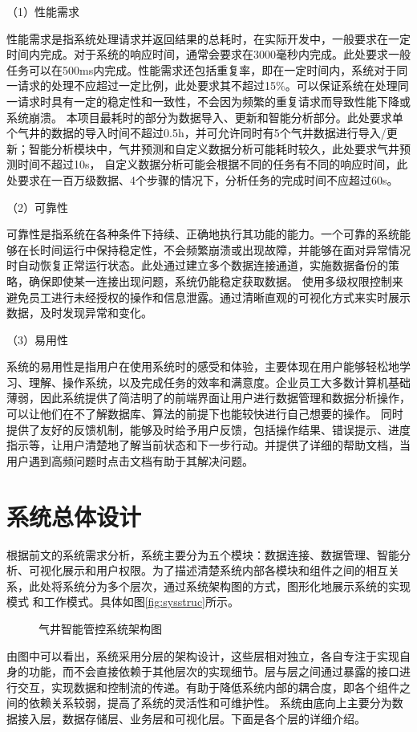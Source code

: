 （1）性能需求

性能需求是指系统处理请求并返回结果的总耗时，在实际开发中，一般要求在一定时间内完成。对于系统的响应时间，通常会要求在3000毫秒内完成。此处要求一般任务可以在500ms内完成。性能需求还包括重复率，即在一定时间内，系统对于同一请求的处理不应超过一定比例，此处要求其不超过15\%。可以保证系统在处理同一请求时具有一定的稳定性和一致性，不会因为频繁的重复请求而导致性能下降或系统崩溃。
本项目最耗时的部分为数据导入、更新和智能分析部分。此处要求单个气井的数据的导入时间不超过0.5h，并可允许同时有5个气井数据进行导入/更新；智能分析模块中，气井预测和自定义数据分析可能耗时较久，此处要求气井预测时间不超过10s，
自定义数据分析可能会根据不同的任务有不同的响应时间，此处要求在一百万级数据、4个步骤的情况下，分析任务的完成时间不应超过60s。

（2）可靠性

可靠性是指系统在各种条件下持续、正确地执行其功能的能力。一个可靠的系统能够在长时间运行中保持稳定性，不会频繁崩溃或出现故障，并能够在面对异常情况时自动恢复正常运行状态。此处通过建立多个数据连接通道，实施数据备份的策略，确保即使某一连接出现问题，系统仍能稳定获取数据。
使用多级权限控制来避免员工进行未经授权的操作和信息泄露。通过清晰直观的可视化方式来实时展示数据，及时发现异常和变化。

（3）易用性

系统的易用性是指用户在使用系统时的感受和体验，主要体现在用户能够轻松地学习、理解、操作系统，以及完成任务的效率和满意度。企业员工大多数计算机基础薄弱，因此系统提供了简洁明了的前端界面让用户进行数据管理和数据分析操作，可以让他们在不了解数据库、算法的前提下也能较快进行自己想要的操作。
同时提供了友好的反馈机制，能够及时给予用户反馈，包括操作结果、错误提示、进度指示等，让用户清楚地了解当前状态和下一步行动。并提供了详细的帮助文档，当用户遇到高频问题时点击文档有助于其解决问题。
\section{系统总体设计}
根据前文的系统需求分析，系统主要分为五个模块：数据连接、数据管理、智能分析、可视化展示和用户权限。为了描述清楚系统内部各模块和组件之间的相互关系，此处将系统分为多个层次，通过系统架构图的方式，图形化地展示系统的实现模式
和工作模式。具体如图\ref{fig:sysstruc}所示。
\begin{figure}[H]
    \centering
    \caption{气井智能管控系统架构图}
\end{figure}
由图中可以看出，系统采用分层的架构设计，这些层相对独立，各自专注于实现自身的功能，而不会直接依赖于其他层次的实现细节。层与层之间通过暴露的接口进行交互，实现数据和控制流的传递。有助于降低系统内部的耦合度，即各个组件之间的依赖关系较弱，提高了系统的灵活性和可维护性。
系统由底向上主要分为数据接入层，数据存储层、业务层和可视化层。下面是各个层的详细介绍。

